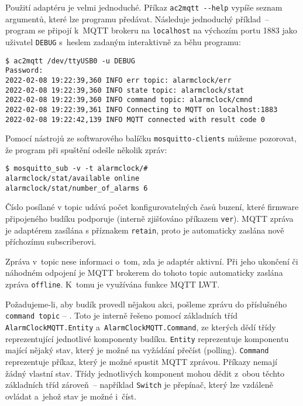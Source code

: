 Použití adaptéru je velmi jednoduché. Příkaz \verb|ac2mqtt --help|
vypíše seznam argumentů, které lze programu předávat.
Následuje jednoduchý příklad~-- program se připojí k~MQTT brokeru na
\texttt{localhost} na výchozím portu 1883 jako uživatel \texttt{DEBUG} s~heslem
zadaným interaktivně za běhu programu:
\begin{lstlisting}[style=terminal]
$ ac2mqtt /dev/ttyUSB0 -u DEBUG
Password:
2022-02-08 19:22:39,360 INFO err topic: alarmclock/err
2022-02-08 19:22:39,360 INFO state topic: alarmclock/stat
2022-02-08 19:22:39,360 INFO command topic: alarmclock/cmnd
2022-02-08 19:22:39,361 INFO Connecting to MQTT on localhost:1883
2022-02-08 19:22:42,139 INFO MQTT connected with result code 0

\end{lstlisting}

Pomocí nástrojů ze softwarového balíčku \texttt{mosquitto-clients}
můžeme pozorovat, že program při spuštění odešle několik zpráv:
\begin{lstlisting}[style=terminal]
$ mosquitto_sub -v -t alarmclock/#
alarmclock/stat/available online
alarmclock/stat/number_of_alarms 6
\end{lstlisting}
Číslo posílané v topic  udává počet
konfigurovatelných časů buzení, které firmware připojeného budíku podporuje
(interně zjišťováno příkazem \texttt{ver}). MQTT zpráva je adaptérem zasílána
s příznakem \texttt{retain}, proto je automaticky zaslána nově příchozímu
subscriberovi.

Zpráva v~topic  nese informaci o~tom, zda je
adaptér aktivní. Při jeho ukončení či náhodném odpojení je MQTT brokerem do
tohoto topic automaticky zaslána zpráva \texttt{offline}. K~tomu je využívána
funkce MQTT \ac{LWT}.

Požadujeme-li, aby budík provedl nějakou akci, pošleme zprávu do příslušného
\texttt{command topic} -- .
Toto je interně řešeno pomocí základních tříd \texttt{AlarmClockMQTT.Entity}
a~\texttt{AlarmClockMQTT.Command}, ze kterých dědí třídy reprezentující
jednotlivé komponenty budíku. \texttt{Entity} reprezentuje komponentu mající
nějaký stav, který je možné na vyžádání přečíst
(\foreignlanguage{english}{polling}). \texttt{Command} reprezentuje příkaz,
který je možné spustit MQTT zprávou. Příkazy nemají žádný vlastní stav.
Třídy jednotlivých komponent mohou dědit z~obou těchto základních tříd
zároveň~-- například \texttt{Switch} je přepínač, který lze vzdáleně ovládat
a~jehož stav je možné i~číst.

